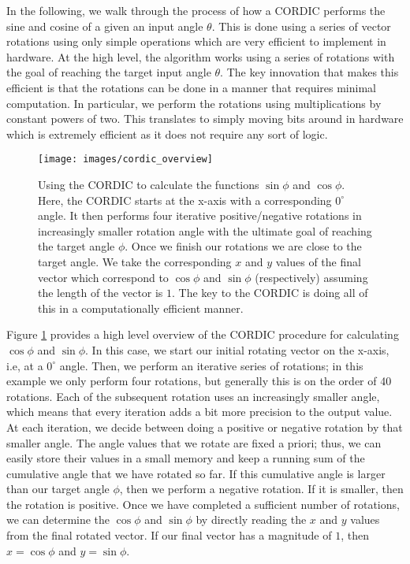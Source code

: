 In the following, we walk through the process of how a CORDIC performs the sine and cosine of a given an input angle $\theta$. This is done using a series of vector rotations using only simple operations which are very efficient to implement in hardware. At the high level, the algorithm works using a series of rotations with the goal of reaching the target input angle $\theta$. The key innovation that makes this efficient is that the rotations can be done in a manner that requires minimal computation. In particular, we perform the rotations using multiplications by constant powers of two. This translates to simply moving bits around in hardware which is extremely efficient as it does not require any sort of logic.  

\begin{figure}
\centering
\texttt{[image: images/cordic\_overview]}
\caption{ Using the CORDIC to calculate the functions $\sin \phi$ and $\cos \phi$. Here, the CORDIC starts at the x-axis with a corresponding $0^\circ$ angle. It then performs four iterative positive/negative rotations in increasingly smaller rotation angle with the ultimate goal of reaching the target angle $\phi$. Once we finish our rotations we are close to the target angle. We take the corresponding $x$ and $y$ values of the final vector which correspond to  $\cos \phi$ and $\sin \phi$ (respectively) assuming the length of the vector is $1$. The key to the CORDIC is doing all of this in a computationally efficient manner. }
\label{fig:cordic_overview}
\end{figure}

Figure \ref{fig:cordic_overview} provides a high level overview of the CORDIC procedure for calculating $\cos \phi$ and $\sin \phi$. In this case, we start our initial rotating vector on the x-axis, i.e, at a $0^\circ$ angle. Then, we perform an iterative series of rotations; in this example we only perform four rotations, but generally this is on the order of 40 rotations. Each of the subsequent rotation uses an increasingly smaller angle, which means that every iteration adds a bit more precision to the output value. At each iteration, we decide between doing a positive or negative rotation by that smaller angle. The angle values that we rotate are fixed a priori; thus, we can easily store their values in a small memory and keep a running sum of the cumulative angle that we have rotated so far. If this cumulative angle is larger than our target angle $\phi$, then we perform a negative rotation. If it is smaller, then the rotation is positive. Once we have completed a sufficient number of rotations, we can determine the $\cos \phi$ and $\sin \phi$ by directly reading the $x$ and $y$ values from the final rotated vector. If our final vector has a magnitude of $1$, then $x = \cos \phi$ and $y = \sin \phi$.


